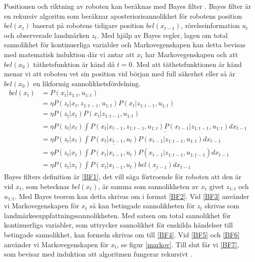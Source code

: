 Positionen och riktning av roboten kan beräknas med Bayes filter \citep{ProbabilisticRobotics}. Bayes filter är en rekursiv algoritm som beräknar aposteriorisannolikhet för robotens position $bel(x_t)$ baserat på robotens tidigare position $bel(x_{t-1})$, rörelseinformation $u_t$ och observerade landmärken $z_t$. Med hjälp av Bayes regler, lagen om total sannolikhet för kontinuerliga variabler och Markovegenskapen kan detta bevisas med matematisk induktion där vi antar att $x_t$ har Markovegenskapen och att $bel(x_0)$ täthetsfunktion är känd då $t = 0$. Med att täthetsfunktionen är känd menar vi att roboten vet sin position vid början med full säkerhet eller så är $bel(x_0)$ en likformig sannolikhetsfördelning.
\begin{align}
bel(x_t) & = P(x_t | z_{1:t}, u_{1:t}) \tag{BF1}\label{BF1} \\
        & = \eta P(z_t | x_t, z_{1:t-1}, u_{1:t}) P(x_t | z_{1:t-1}, u_{1:t}) \tag{BF2}\label{BF2}\\
        & = \eta \underline{P(z_t | x_t)} P(x_t | z_{1:t-1}, u_{1:t}) \tag{BF3}\label{BF3}\\
        & = \eta P(z_t | x_t) \underline{\int P(x_t | x_{t-1}, z_{1:t-1}, u_{1:t}) P(x_{t-1} | z_{1:t-1}, u_{1:t}) dx_{t-1}} \tag{BF4}\label{BF4}\\
        & = \eta P(z_t | x_t) \int \underline{P(x_t | x_{t-1}, u_t)} P(x_{t-1} | z_{1:t-1}, u_{1:t}) dx_{t-1} \tag{BF5}\label{BF5}\\
        & = \eta P(z_t | x_t) \int P(x_t | x_{t-1}, u_t) P(x_{t-1} | z_{1:t-1}, \underline{u_{1:t-1}}) dx_{t-1} \tag{BF6}\label{BF6}\\
        & = \eta P(z_t | x_t) \int P(x_t | x_{t-1}, u_t) \underline{bel(x_{t-1})} dx_{t-1} \tag{BF7}\label{BF7}
\end{align}
Bayes filters definition är \ref{BF1}, det vill säga förtroende för roboten att den är vid $x_t$, som betecknas $bel(x_t)$, är samma som sannolikheten av $x_t$ givet $z_{1:t}$ och $u_{1:t}$. Med Bayes teorem kan detta skrivas om i format \ref{BF2}. Vid \ref{BF3} använder vi Markovegenskapen för $x_t$ så kan betingade sannolikheten för $z_t$ skrivas som landmärkesuppfattningssannolikheten. Med satsen om total sannolikhet för kontinuerliga variabler, som uttrycker sannolikhet för enskilda händelser till betingade sannolikhet, kan formeln skrivas om till \ref{BF4}. Vid \ref{BF5} och \ref{BF6} använder vi Markovegenskapen för $x_t$, se figur \ref{markov}. Till slut får vi \ref{BF7}, som bevisar med induktion att algoritmen fungerar rekursivt \citep{ProbabilisticRobotics}.

